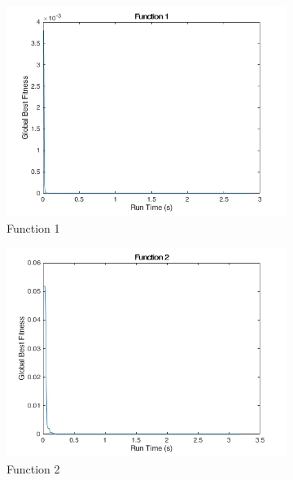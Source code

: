 \begin{figure}
  \begin{subfigure}[b]{0.4\textwidth}
    \includegraphics[width=\textwidth]{img/summary/function1}
    \caption{Function 1}
  \end{subfigure}
  \begin{subfigure}[b]{0.4\textwidth}
    \includegraphics[width=\textwidth]{img/summary/function2}
    \caption{Function 2}
  \end{subfigure}
  \begin{subfigure}[b]{0.4\textwidth}

\end{subfigure}
\end{figure}
